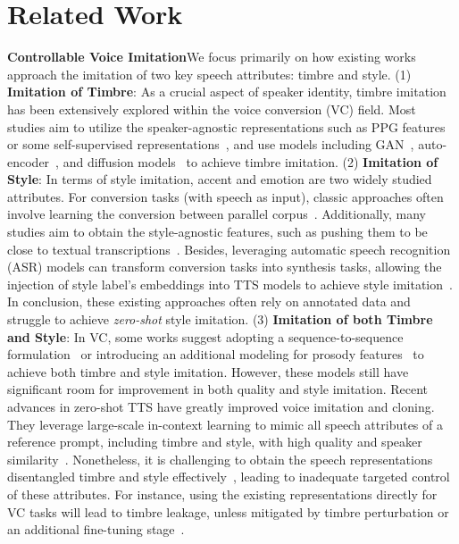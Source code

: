 \section{Related Work}
\textbf{Controllable Voice Imitation}\quad We focus primarily on how existing works approach the imitation of two key speech attributes: timbre and style. (1) \textbf{Imitation of Timbre}: As a crucial aspect of speaker identity, timbre imitation has been extensively explored within the voice conversion (VC) field. Most studies aim to utilize the speaker-agnostic representations such as PPG features~\cite{ppg-vc,voiceshop} or some self-supervised representations~\cite{self-supervised-vc,amphion-svc}, and use models including GAN~\cite{cyclegan-vc,stargan-vc}, auto-encoder~\cite{autovc,speechsplit}, and diffusion models~\cite{diffvc,diff-hiervc} to achieve timbre imitation. (2) \textbf{Imitation of Style}: In terms of style imitation, accent and emotion are two widely studied attributes. For conversion tasks (with speech as input), classic approaches often involve learning the conversion between parallel corpus~\cite{parallel-ac-zhaoguanlong21,parallel-ec-2016,voiceshop,convertandspeak}. Additionally, many studies aim to obtain the style-agnostic features, such as pushing them to be close to textual transcriptions~\cite{zhouyi-ac,chenxi-tts-ac,emovox,pavits}. Besides, leveraging automatic speech recognition (ASR) models can transform conversion tasks into synthesis tasks, allowing the injection of style label's embeddings into TTS models to achieve style imitation~\cite{asr-ac,liusongxiang-ac}. In conclusion, these existing approaches often rely on annotated data and struggle to achieve \textit{zero-shot} style imitation. (3) \textbf{Imitation of both Timbre and Style}: In VC, some works suggest adopting a sequence-to-sequence formulation~\cite{non-parallel-seq2seq-vc,lmvc} or introducing an additional modeling for prosody features~\cite{diff-hiervc,hierspeech++} to achieve both timbre and style imitation. However, these models still have significant room for improvement in both quality and style imitation. Recent advances in zero-shot TTS have greatly improved voice imitation and cloning. They leverage large-scale in-context learning to mimic all speech attributes of a reference prompt, including timbre and style, with high quality and speaker similarity~\cite{valle,megatts,ns3,seedtts,maskgct,u-style}. Nonetheless, it is challenging to obtain the speech representations disentangled timbre and style effectively~\cite{basetts,u-style}, leading to inadequate targeted control of these attributes. For instance, using the existing representations directly for VC tasks will lead to timbre leakage, unless mitigated by timbre perturbation or an additional fine-tuning stage~\cite{seedtts,maskgct}.

